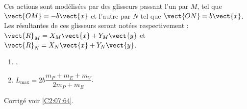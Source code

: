 Ces actions sont modélisées par des glisseurs passant l'un par $M$, tel que $\vect{OM}=-b\vect{x}$ et l'autre par $N$ tel que $\vect{ON}=b\vect{x}$. 
Les résultantes de ces glisseurs seront notées respectivement : $\vect{R}_M=X_M\vect{x}+Y_M\vect{y}$ 
et $\vect{R}_N=X_N\vect{x}+Y_N\vect{y}$.

\ifprof
\else
\fi

\ifprof
\else
\fi


\ifprof
\footnotesize
\begin{enumerate}
\item .
\item $L_{\text{max}}=2b\dfrac{m_P+m_E+m_V}{2m_P+m_E}$.
\end{enumerate}
\normalsize
\else
\begin{flushright}
\footnotesize{Corrigé  voir \ref{C2:07:64}.}
\end{flushright}%
\fi